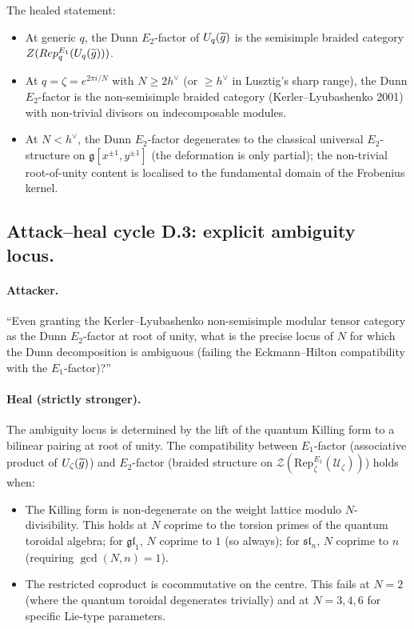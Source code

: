 \documentclass[11pt]{article}
\newcommand{\Eone}{E_{1}}
\newcommand{\Etwo}{E_{2}}
\newcommand{\cU}{\mathcal{U}}
\newcommand{\cZ}{\mathcal{Z}}
\newcommand{\Rep}{\mathrm{Rep}}
\newcommand{\frakg}{\mathfrak{g}}
\newcommand{\fgl}{\mathfrak{gl}}
\newcommand{\fsl}{\mathfrak{sl}}
\begin{document}
The healed statement:
\begin{itemize}
\item At generic $q$, the Dunn $\Etwo$-factor of
  $\cU_q(\widetilde{\widehat\frakg})$ is the semisimple braided
  category $\cZ(\Rep_q^{\Eone}(\cU_q(\widetilde{\widehat\frakg})))$.
\item At $q = \zeta = e^{2\pi i/N}$ with $N \geq 2h^\vee$ (or
  $\geq h^\vee$ in Lusztig's sharp range), the Dunn $\Etwo$-factor is
  the non-semisimple braided category (Kerler--Lyubashenko 2001)
  with non-trivial divisors on indecomposable modules.
\item At $N < h^\vee$, the Dunn $\Etwo$-factor degenerates to the
  classical universal $\Etwo$-structure on $\frakg[x^{\pm 1}, y^{\pm
  1}]$ (the deformation is only partial); the non-trivial
  root-of-unity content is localised to the fundamental domain of the
  Frobenius kernel.
\end{itemize}

\subsection{Attack--heal cycle D.3: explicit ambiguity locus.}

\paragraph{Attacker.}
``Even granting the Kerler--Lyubashenko non-semisimple modular tensor
category as the Dunn $\Etwo$-factor at root of unity, what is the
precise locus of $N$ for which the Dunn decomposition is ambiguous
(failing the Eckmann--Hilton compatibility with the $\Eone$-factor)?''

\paragraph{Heal (strictly stronger).}
The ambiguity locus is determined by the lift of the quantum
Killing form to a bilinear pairing at root of unity. The compatibility
between $\Eone$-factor (associative product of
$\cU_\zeta(\widetilde{\widehat\frakg})$) and $\Etwo$-factor
(braided structure on $\cZ(\Rep_\zeta^{\Eone}(\cU_\zeta))$) holds when:
\begin{itemize}
\item The Killing form is non-degenerate on the weight lattice modulo
  $N$-divisibility. This holds at $N$ coprime to the torsion primes of
  the quantum toroidal algebra; for $\fgl_1$, $N$ coprime to $1$ (so
  always); for $\fsl_n$, $N$ coprime to $n$ (requiring
  $\gcd(N, n) = 1$).
\item The restricted coproduct is cocommutative on the centre. This
  fails at $N = 2$ (where the quantum toroidal degenerates
  trivially) and at $N = 3, 4, 6$ for specific Lie-type parameters.
\end{itemize}
\end{document}

